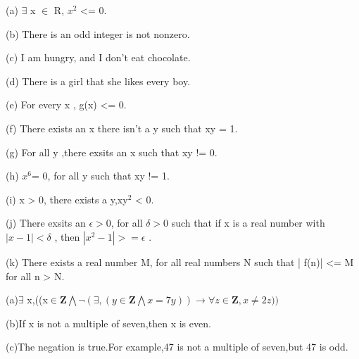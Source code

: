 \documentclass[a4paper, justified]{tufte-handout}
\begin{document}
\begin{solution}

  (a) $\exists$ x $\in $ R,  $x^2$ <= 0.

  (b) There is an odd integer is not nonzero.

  (c) I am hungry, and I don't eat chocolate.

  (d) There is a girl that she likes every boy.

  (e) For every x , g(x) <= 0.

  (f) There exists an x there isn't a y such that xy = 1.

  (g) For all y ,there exsits an x such that xy != 0.

  (h) $x^6$= 0, for all y such that xy != 1.

  (i) x > 0, there exists a y,xy$^2$ < 0.

  (j) There exsits an $\epsilon  > 0$, for all $\delta  > 0$ such that if x is a real number with $|x−1| < \delta$ ,
  then $|x^2 −1| >= \epsilon$ .

  (k) There exists a real number M, for all real numbers N such that | f(n)| <= M for
  all n > N.
\end{solution}

\begin{problem}
\end{problem}

\begin{solution}

  (a)$\exists$ x,((x$\in \mathbf{Z} \bigwedge \neg (\exists,(y \in \mathbf{Z}\bigwedge x=7y))\rightarrow \forall z \in \mathbf{Z},x\neq 2z ))$

  (b)If x is not a multiple of seven,then x is even.

  (c)The negation is true.For example,47 is not a multiple of seven,but 47 is odd.
\end{solution}

\begin{problem}
\end{problem}
\end{document}
